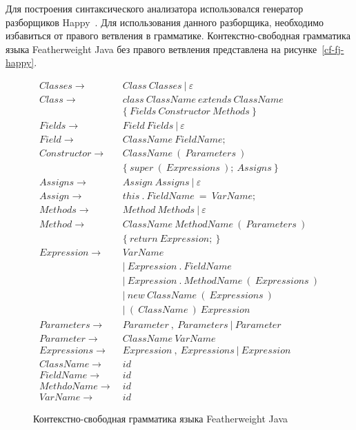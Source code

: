 Для построения синтаксического анализатора использовался генератор разборщиков Happy~\cite{happy}.
Для использования данного разборщика, необходимо избавиться от правого ветвления в грамматике.
Контекстно-свободная грамматика языка Featherweight Java без правого ветвления представлена на рисунке~\ref{cf-fj-happy}.
\begin{figure}
    \begin{align*}
        Classes \rightarrow&\ Class\ Classes\ |\ \varepsilon\\
        Class \rightarrow&\ class\ ClassName\ extends\ ClassName\\
        &\ \{\ Fields\ Constructor\ Methods\ \}\\
        Fields \rightarrow&\ Field\ Fields\ |\ \varepsilon\\
        Field \rightarrow&\ ClassName\ FieldName;\\
        Constructor \rightarrow& \ ClassName\ (\ Parameters\ )\\
        &\ \{\ super\ (\ Expressions\ );\ Assigns\ \}\\
        Assigns \rightarrow&\ Assign\ Assigns\ |\ \varepsilon\\
        Assign \rightarrow&\ this\ .\ FieldName\ =\ VarName;\\
        Methods \rightarrow&\ Method\ Methods\ |\ \varepsilon\\
        Method \rightarrow&\ ClassName\ MethodName\ (\ Parameters\ )\\
        &\ \{\ return\ Expression;\ \}\\
        Expression \rightarrow&\ VarName\\
        &\ |\ Expression\ .\ FieldName\\
        &\ |\ Expression\ .\ MethodName\ (\ Expressions\ )\\
        &\ |\ new\ ClassName\ (\ Expressions\ )\\
        &\ |\ (\ ClassName\ )\ Expression\\
        Parameters \rightarrow&\ Parameter\ ,\ Parameters\ |\ Parameter\\
        Parameter \rightarrow&\ ClassName\ VarName\\
        Expressions \rightarrow&\ Expression\ ,\ Expressions\ |\ Expression\\
        ClassName \rightarrow&\ id\\
        FieldName \rightarrow&\ id\\
        MethdoName \rightarrow&\ id\\
        VarName \rightarrow&\ id
    \end{align*}
    \caption{Контекстно-свободная грамматика языка Featherweight Java}
    \label{cf-fj}
\end{figure}

